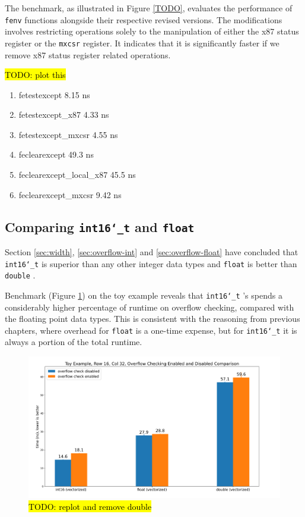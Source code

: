 \documentclass[logo,bsc,singlespacing,parskip]{infthesis}
\newcommand{\dtshort}{\texttt{int16\char`_t} }
\newcommand{\dtfloat}{\texttt{float} }
\newcommand{\dtdouble}{\texttt{double} }
\newcommand{\mxcsr}{\texttt{mxcsr} }
\newenvironment{compactlist}
{ \begin{enumerate}
    \setlength{\itemsep}{0pt}
    \setlength{\parskip}{0pt}
    \setlength{\parsep}{0pt}     
}
{ \end{enumerate} }
\begin{document}
The benchmark, as illustrated in Figure \ref{TODO}, evaluates the performance of
\texttt{fenv} functions alongside their respective revised versions. The
modifications involves restricting operations solely
to the manipulation of either the x87 status register or the \mxcsr register. 
It indicates that it is significantly faster if we remove x87 status register
related operations. 

\hl{TODO: plot this}
\small
\begin{compactlist}
\item fetestexcept                           8.15 ns
\item fetestexcept\_x87                       4.33 ns
\item fetestexcept\_mxcsr                     4.55 ns
\item feclearexcept                          49.3 ns
\item feclearexcept\_local\_x87                45.5 ns
\item feclearexcept\_mxcsr                    9.42 ns
\end{compactlist}
\normalsize

\subsection{Comparing \dtshort and \dtfloat}

Section \ref{sec:width}, \ref{sec:overflow-int} and \ref{sec:overflow-float}
have concluded that \dtshort is superior than any other integer data types and
\dtfloat is better than \dtdouble. 


Benchmark (Figure \ref{fig:i16-f32}) on the toy example reveals that \dtshort's
spends a considerably higher percentage of runtime on overflow checking,
compared with the floating point data types. This is consistent with the
reasoning from previous chapters, where overhead for \dtfloat is a one-time
expense, but for \dtshort it is always a portion of the total runtime. 

\begin{figure}
    \includegraphics[width=\linewidth]{image/i16-f32.png}
    \caption{\hl{TODO: replot and remove double}}
    \label{fig:i16-f32}
\end{figure}
\end{document}
